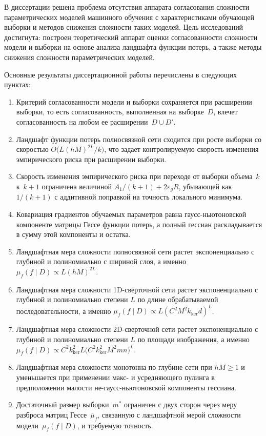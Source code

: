 В диссертации решена проблема отсутствия аппарата согласования сложности параметрических моделей машинного обучения с характеристиками обучающей выборки и методов снижения сложности таких моделей.
Цель исследований достигнута: построен теоретический аппарат оценки согласованности сложности модели и выборки на основе анализа ландшафта функции потерь, а также методы снижения сложности параметрических моделей.

Основные результаты диссертационной работы перечислены в следующих пунктах:
\begin{enumerate}
    \item Критерий согласованности модели и выборки сохраняется при расширении выборки, то есть согласованность, выполненная на выборке~$D$, влечет согласованность на любом ее расширении~$D\cup D'$.
    \item Ландшафт функции потерь полносвязной сети сходится при росте выборки со скоростью $O\bigl(L(hM)^{2L}/k\bigr)$, что задает контролируемую скорость изменения эмпирического риска при расширении выборки.
    \item Скорость изменения эмпирического риска при переходе от выборки объема~$k$ к~$k+1$ ограничена величиной $A_1/(k+1)+2\varepsilon_gR$, убывающей как $1/(k+1)$ с аддитивной поправкой на точность локального минимума.
    \item Ковариация градиентов обучаемых параметров равна гаусс-ньютоновской компоненте матрицы Гессе функции потерь, а полный гессиан раскладывается в сумму этой компоненты и остатка.
    \item Ландшафтная мера сложности полносвязной сети растет экспоненциально с глубиной и полиномиально с шириной слоя, а именно $\mu_f(f\mid D)\propto L(hM)^{2L}$.
    \item Ландшафтная мера сложности 1D-сверточной сети растет экспоненциально с глубиной и полиномиально степени $L$ по длине обрабатываемой последовательности, а именно $\mu_f(f\mid D)\propto L(C^2M^2k_{\mathrm{ker}}d)^{L}$.
    \item Ландшафтная мера сложности 2D-сверточной сети растет экспоненциально с глубиной и полиномиально степени $L$ по площади изображения, а именно $\mu_f(f\mid D)\propto C^2k_{\mathrm{ker}}^2L\bigl(C^2k_{\mathrm{ker}}^2M^2mn\bigr)^{L}$.
    \item Ландшафтная мера сложности монотонна по глубине сети при $hM\ge 1$ и уменьшается при применении макс- и усредняющего пулинга в предположении малости не-гаусс-ньютоновской компоненты гессиана.
    \item Достаточный размер выборки~$m^*$ ограничен с двух сторон через меру разброса матриц Гессе~$\bar\mu_f$, связанную с ландшафтной мерой сложности модели~$\mu_f(f\mid D)$, и требуемую точность.

\end{enumerate}

